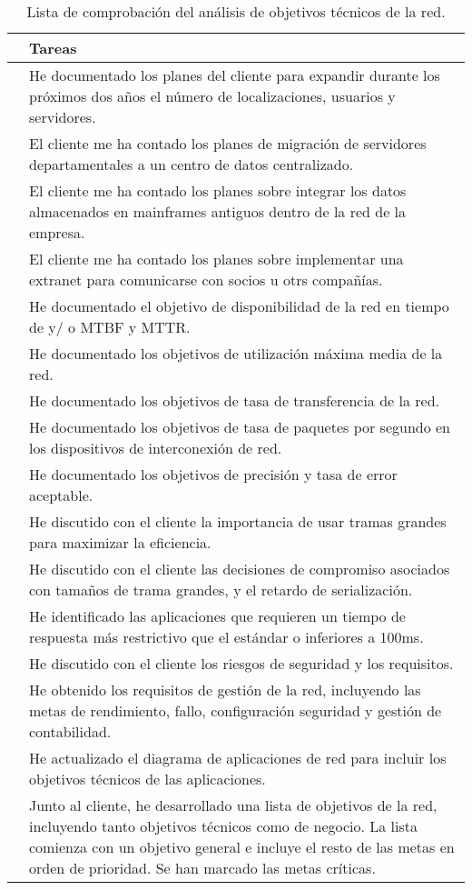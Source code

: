 \begin{table}[H]
	\begin{center}
		\begin{tabular}{|c|l|}
			\hline 
			& Tareas  \\ 
			\hline \hline
			& He documentado los planes del cliente para expandir durante los
			próximos dos años el número de localizaciones, usuarios y servidores.  \\ \hline
			& El cliente me ha contado los planes de migración de servidores
			departamentales a un centro de datos centralizado.  \\ \hline
			& El cliente me ha contado los planes sobre integrar los datos
			almacenados en mainframes antiguos dentro de la red de la empresa.  \\ \hline
			& El cliente me ha contado los planes sobre implementar una extranet
			para comunicarse con socios u otrs compañías.  \\ \hline
			& He documentado el objetivo de disponibilidad de la red en tiempo de y/
			o MTBF y MTTR.  \\ \hline
			& He documentado los objetivos de utilización máxima media de la red.  \\ \hline
			& He documentado los objetivos de tasa de transferencia de la red.  \\ \hline
			& He documentado los objetivos de tasa de paquetes por segundo en los
			dispositivos de interconexión de red.  \\ \hline
			& He documentado los objetivos de precisión y tasa de error aceptable.  \\ \hline
			& He discutido con el cliente la importancia de usar tramas grandes para
			maximizar la eficiencia.  \\ \hline
			& He discutido con el cliente las decisiones de compromiso asociados
			con tamaños de trama grandes, y el retardo de serialización.  \\ \hline
			& He identificado las aplicaciones que requieren un tiempo de respuesta
			más restrictivo que el estándar o inferiores a 100ms.  \\ \hline
			& He discutido con el cliente los riesgos de seguridad y los requisitos.  \\ \hline
			& He obtenido los requisitos de gestión de la red, incluyendo las metas de
			rendimiento, fallo, configuración seguridad y gestión de contabilidad.  \\ \hline
			& He actualizado el diagrama de aplicaciones de red para incluir los objetivos técnicos de las aplicaciones.  \\ \hline
			& Junto al cliente, he desarrollado una lista de objetivos de la red,
			incluyendo tanto objetivos técnicos como de negocio. La lista
			comienza con un objetivo general e incluye el resto de las metas en
			orden de prioridad. Se han marcado las metas críticas.  \\ \hline
		\end{tabular}
		\caption{Lista de comprobación del análisis de objetivos técnicos de la red.}
		\label{tabla:tabla2}
	\end{center}
\end{table}

